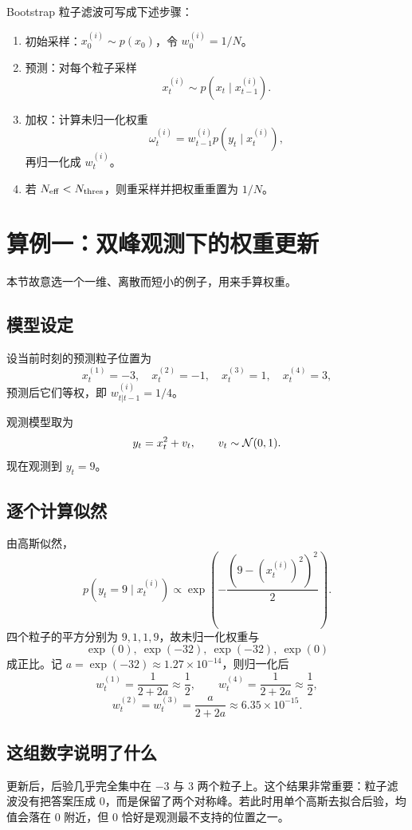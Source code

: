 \documentclass[12pt,a4paper]{ctexart}
\begin{document}
Bootstrap 粒子滤波可写成下述步骤：

\begin{enumerate}
  \item 初始采样：\(x_0^{(i)} \sim p(x_0)\)，令 \(w_0^{(i)} = 1/N\)。
  \item 预测：对每个粒子采样
  \[
  x_t^{(i)} \sim p(x_t \mid x_{t-1}^{(i)}).
  \]
  \item 加权：计算未归一化权重
  \[
  \omega_t^{(i)} = w_{t-1}^{(i)} p(y_t \mid x_t^{(i)}),
  \]
  再归一化成 \(w_t^{(i)}\)。
  \item 若 \(N_{\mathrm{eff}} < N_{\mathrm{thres}}\)，则重采样并把权重重置为 \(1/N\)。
\end{enumerate}

\section{算例一：双峰观测下的权重更新}

本节故意选一个一维、离散而短小的例子，用来手算权重。

\subsection{模型设定}

设当前时刻的预测粒子位置为
\[
x_t^{(1)}=-3,\quad x_t^{(2)}=-1,\quad x_t^{(3)}=1,\quad x_t^{(4)}=3,
\]
预测后它们等权，即 \(w_{t|t-1}^{(i)} = 1/4\)。

观测模型取为
\[
y_t = x_t^2 + v_t,\qquad v_t \sim \mathcal{N}(0,1).
\]
现在观测到 \(y_t = 9\)。

\subsection{逐个计算似然}

由高斯似然，
\[
p(y_t=9 \mid x_t^{(i)})
\propto \exp\!\left(-\frac{(9-(x_t^{(i)})^2)^2}{2}\right).
\]
四个粒子的平方分别为 \(9,1,1,9\)，故未归一化权重与
\[
\exp(0),\ \exp(-32),\ \exp(-32),\ \exp(0)
\]
成正比。记 \(a=\exp(-32)\approx 1.27\times 10^{-14}\)，则归一化后
\[
w_t^{(1)} = \frac{1}{2+2a}\approx \frac{1}{2},
\qquad
w_t^{(4)} = \frac{1}{2+2a}\approx \frac{1}{2},
\]
\[
w_t^{(2)} = w_t^{(3)} = \frac{a}{2+2a}\approx 6.35\times 10^{-15}.
\]

\subsection{这组数字说明了什么}

更新后，后验几乎完全集中在 \(-3\) 与 \(3\) 两个粒子上。这个结果非常重要：粒子滤波没有把答案压成 \(0\)，而是保留了两个对称峰。若此时用单个高斯去拟合后验，均值会落在 \(0\) 附近，但 \(0\) 恰好是观测最不支持的位置之一。
\end{document}

